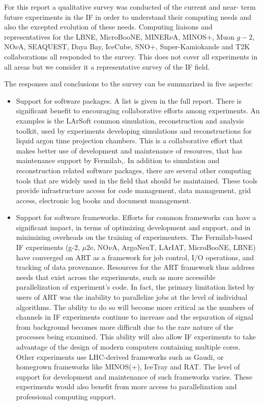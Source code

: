 For this report a qualitative survey was conducted of the current and near-
term future experiments in the IF in order to understand their computing needs
and also the excepted evolution of these needs.  Computing liaisons and
representatives for the LBNE, MicroBooNE, MINER$\nu$A, MINOS$+$, Muon $g-2$,
NO$\nu$A, SEAQUEST,  Daya Bay, IceCube, SNO+, Super-Kamiokande and T2K
collaborations all responded to the survey. This does not cover all
experiments in all areas but we consider it a representative survey of the IF
field.

The responses and conclusions to the survey can be summarized in five aspects:  

\begin{itemize}
\item Support for software packages. A list is given in the full report. There
is significant benefit to encouraging collaborative efforts among experiments.
An examples is the LArSoft common simulation, reconstruction and
analysis toolkit, used by experiments developing simulations and
reconstructions for liquid argon time projection chambers. This is a
collaborative effort that makes better use of development and maintenance of resources, that has maintenance support by Fermilab,. 
In addition to simulation and reconstruction related software packages, there are
several other computing tools that are widely used in the field that should be
maintained.  These tools provide infrastructure access for code management,
data management, grid access, electronic log books and document management.

\item Support for software frameworks. Efforts for common frameworks can have
a significant impact, in terms of optimizing  development and support, and in
minimizing overheads on the training of experimenters.  The Fermilab-based IF
experiments (g-2, $\mu2$e, NO$\nu$A, ArgoNeuT, LArIAT, MicroBooNE, LBNE) have
converged on ART as a framework for job control, I/O operations, and tracking
of data provenance. Resources for the ART framework thus address needs that
exist across the experiments, such as more accessible parallelization of
experiment's code. In fact, the primary limitation listed by users of ART was
the inability to parallelize jobs at the level of individual algorithms.  The
ability to do so will become more critical as the numbers of channels in IF
experiments continue to increase and the separation of signal from background
becomes more difficult due to the rare nature of the processes being examined.
This ability will also allow IF experiments to take advantage of the design of
modern computers containing multiple cores. Other experiments use LHC-derived
frameworks such as Gaudi, or homegrown frameworks like MINOS(+), IceTray and
RAT. The level of support for development and maintenance of such frameworks
varies. These experiments would also benefit from more access to
parallelization and professional computing support.


\end{itemize}
